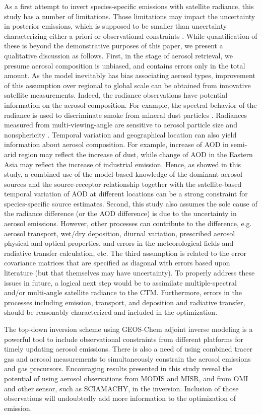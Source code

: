  As a first attempt to invert species-specific emissions with satellite radiance, this study has a number of limitations.
 Those limitations may impact the uncertainty in posterior emissions, which is supposed to be smaller than uncertainty characterizing either a priori or observational constraints \citep{rodgers00}.
  While quantification of these is beyond the demonstrative purposes of this paper, we present a qualitative discussion as follows.
 First, in the stage of aerosol retrieval, we presume aerosol composition is unbiased, and contains errors only in the total amount.
 As the model inevitably has bias associating aerosol types, improvement of this assumption over regional to global scale can be obtained from innovative satellite measurements.
 Indeed, the radiance observations have potential information on the aerosol composition.
 For example, the spectral behavior of the radiance is used to discriminate smoke from mineral dust particles \citep{king99,kaufman02}.
 Radiances measured from multi-viewing-angle are sensitive to aerosol particle size and nonsphericity \citep{martonchik09}.
 Temporal variation and geographical location can also yield information about aerosol composition.
 For example, increase of AOD in semi-arid region may reflect the increase of dust, while change of AOD in the Eastern Asia may reflect the increase of industrial emission.
 Hence, as showed in this study, a combined use of the model-based knowledge of the dominant aerosol sources and the source-receptor relationship together with the satellite-based temporal variation of AOD at different locations can be a strong constraint for species-specific source estimates.
 Second, this study also assumes the sole cause of the radiance difference (or the AOD difference) is due to the uncertainty in aerosol emissions.
 However, other processes can contribute to the difference, e.g. aerosol transport, wet/dry deposition, diurnal variation, prescribed aerosol physical and optical properties, and errors in the meteorological fields and radiative transfer calculation, etc.
 The third assumption is related to the error covariance matrices that are specified as diagonal with errors based upon literature (but that themselves may have uncertainty).
 To properly address these issues in future, a logical next step would be to assimilate multiple-spectral and/or multi-angle satellite radiance to the CTM.
 Furthermore, errors in the processes including emission, transport, and deposition and radiative transfer, should be reasonably characterized and included in the optimization. 

The top-down inversion scheme using GEOS-Chem adjoint inverse modeling is a powerful tool to include observational constraints from different platforms for timely updating aerosol emissions.
 There is also a need of using combined tracer gas and aerosol measurements to simultaneously constrain the aerosol emissions and gas precursors.
 Encouraging results presented in this study reveal the potential of using aerosol observations from MODIS and MISR,  and  from OMI and other sensor, such as SCIAMACHY, in the inversion. Inclusion of those observations will undoubtedly add more information to the optimization of emission. 


